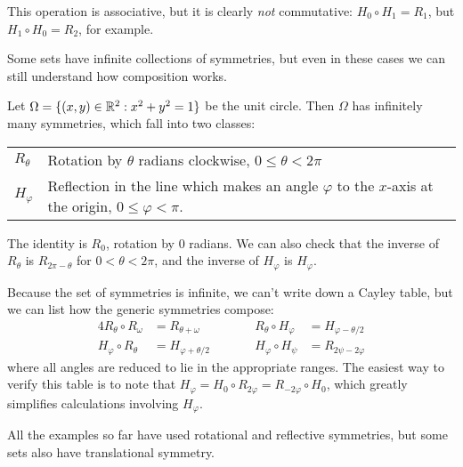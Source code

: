 \begin{example}
  \medskip
  
  This operation is associative, but it is clearly \emph{not} commutative:
  $H_{0} \circ H_{1} = R_{1}$, but $H_{1} \circ H_{0} = R_{2}$, for example.
\end{example}

Some sets have infinite collections of symmetries, but even in these cases
we can still understand how composition works.

\begin{example}\label{eg:circlesymmetry}
  Let $\Omega = \{(x,y) \in \mathbb{R}^{2} : x^{2} + y^{2} = 1\}$ be the unit
  circle.  Then $\Omega$ has infinitely many symmetries, which fall into two
  classes:
  
  \begin{tabular}{lp{3.5in}}
    $R_{\theta}$ & Rotation by $\theta$ radians clockwise,
      $0 \le \theta < 2\pi$ \\
    $H_{\varphi}$ & Reflection in the line which makes an angle $\varphi$
      to the $x$-axis at the origin, $0 \le \varphi < \pi$.
  \end{tabular}
  
  The identity is $R_{0}$, rotation by $0$ radians.  We can also check that
  the inverse of $R_{\theta}$ is $R_{2\pi - \theta}$ for $0 < \theta < 2\pi$,
  and the inverse of $H_{\varphi}$ is $H_{\varphi}$.
  
  Because the set of symmetries is infinite, we can't write down a Cayley
  table, but we can list how the generic symmetries compose:
  \begin{alignat*}{4}
    R_{\theta} \circ R_{\omega} &= R_{\theta + \omega} &\qquad&
    R_{\theta} \circ H_{\varphi} &=  H_{\varphi - \theta/2}\\
    H_{\varphi} \circ R_{\theta} &= H_{\varphi + \theta/2}&&
    H_{\varphi} \circ H_{\psi} &= R_{2\psi - 2\varphi}
  \end{alignat*}
  where all angles are reduced to lie in the appropriate ranges.  The easiest
  way to verify this table is to note that $H_{\varphi} = H_{0} \circ
  R_{2\varphi} = R_{-2\varphi} \circ H_{0}$, which greatly simplifies
  calculations involving $H_{\varphi}$.
\end{example}

All the examples so far have used rotational and reflective symmetries, but
some sets also have translational symmetry.

